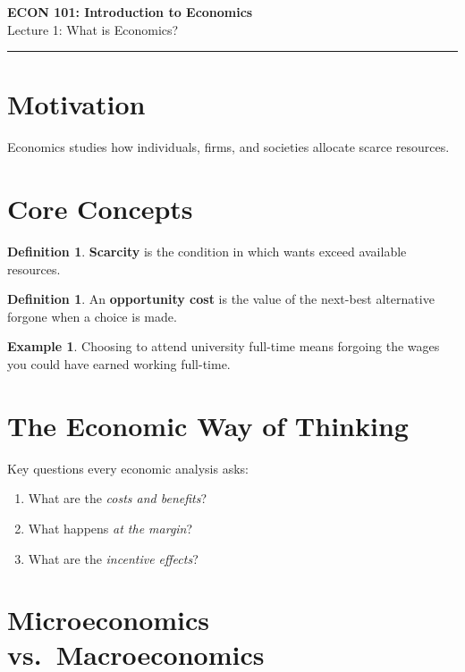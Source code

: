 \documentclass[11pt]{article}
\theoremstyle{definition}
\newtheorem{definition}[theorem]{Definition}
\newtheorem{example}[theorem]{Example}
\theoremstyle{remark}
\begin{document}
\begin{center}
  {\LARGE\bfseries ECON 101: Introduction to Economics}\\[0.4em]
  {\large Lecture 1: What is Economics?}
\end{center}
\medskip\hrule\medskip

\section{Motivation}

Economics studies how individuals, firms, and societies allocate scarce resources.

\section{Core Concepts}

\begin{definition}
  \textbf{Scarcity} is the condition in which wants exceed available resources.
\end{definition}

\begin{definition}
  An \textbf{opportunity cost} is the value of the next-best alternative forgone when a choice is made.
\end{definition}

\begin{example}
  Choosing to attend university full-time means forgoing the wages you could have earned working full-time.
\end{example}

\section{The Economic Way of Thinking}

Key questions every economic analysis asks:
\begin{enumerate}[(1)]
  \item What are the \textit{costs and benefits}?
  \item What happens \textit{at the margin}?
  \item What are the \textit{incentive effects}?
\end{enumerate}

\section{Microeconomics vs.\ Macroeconomics}
\end{document}
